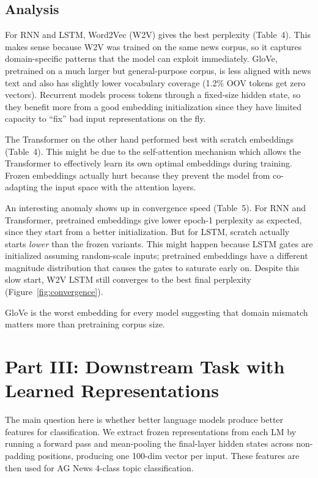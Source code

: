 \documentclass[11pt,a4paper]{article}
\begin{document}
\subsection*{Analysis}

For RNN and LSTM, Word2Vec (W2V) gives the best perplexity (Table~4). This makes sense because W2V was trained on the same news corpus, so it captures domain-specific patterns that the model can exploit immediately. GloVe, pretrained on a much larger but general-purpose corpus, is less aligned with news text and also has slightly lower vocabulary coverage (1.2\% OOV tokens get zero vectors). Recurrent models process tokens through a fixed-size hidden state, so they benefit more from a good embedding initialization since they have limited capacity to ``fix'' bad input representations on the fly.

The Transformer on the other hand performed best with scratch embeddings (Table~4). This might be due to the self-attention mechanism which allows the Transformer to effectively learn its own optimal embeddings during training. Frozen embeddings actually hurt because they prevent the model from co-adapting the input space with the attention layers.

An interesting anomaly shows up in convergence speed (Table~5). For RNN and Transformer, pretrained embeddings give lower epoch-1 perplexity as expected, since they start from a better initialization. But for LSTM, scratch actually starts \emph{lower} than the frozen variants. This might happen because LSTM gates are initialized assuming random-scale inputs; pretrained embeddings have a different magnitude distribution that causes the gates to saturate early on. Despite this slow start, W2V LSTM still converges to the best final perplexity (Figure~\ref{fig:convergence}).

GloVe is the worst embedding for every model suggesting that domain mismatch matters more than pretraining corpus size.

\section{Part III: Downstream Task with Learned Representations}

The main question here is whether better language models produce better features for classification. We extract frozen representations from each LM by running a forward pass and mean-pooling the final-layer hidden states across non-padding positions, producing one 100-dim vector per input. These features are then used for AG News 4-class topic classification.
\end{document}
